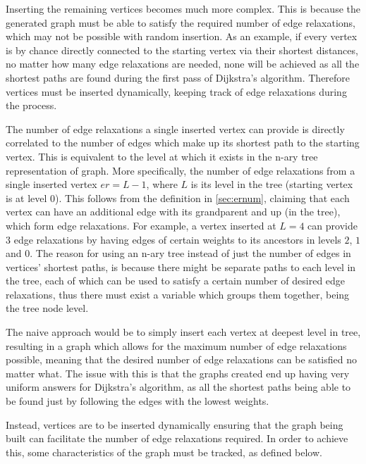 \documentclass{l4proj}
\begin{document}
Inserting the remaining vertices becomes much more complex. This is because the generated graph must be able to satisfy the required number of edge relaxations, which may not be possible with random insertion. As an example, if every vertex is by chance directly connected to the starting vertex via their shortest distances, no matter how many edge relaxations are needed, none will be achieved as all the shortest paths are found during the first pass of Dijkstra's algorithm. Therefore vertices must be inserted dynamically, keeping track of edge relaxations during the process.

The number of edge relaxations a single inserted vertex can provide is directly correlated to the number of edges which make up its shortest path to the starting vertex. This is equivalent to the level at which it exists in the n-ary tree representation of graph. More specifically, the number of edge relaxations from a single inserted vertex $er = L-1$, where $L$ is its level in the tree (starting vertex is at level $0$). This follows from the definition in \autoref{sec:ernum}, claiming that each vertex can have an additional edge with its grandparent and up (in the tree), which form edge relaxations. For example, a vertex inserted at $L=4$ can provide $3$ edge relaxations by having edges of certain weights to its ancestors in levels $2$, $1$ and $0$. The reason for using an n-ary tree instead of just the number of edges in vertices' shortest paths, is because there might be separate paths to each level in the tree, each of which can be used to satisfy a certain number of desired edge relaxations, thus there must exist a variable which groups them together, being the tree node level.

The naive approach would be to simply insert each vertex at deepest level in tree, resulting in a graph which allows for the maximum number of edge relaxations possible, meaning that the desired number of edge relaxations can be satisfied no matter what. The issue with this is that the graphs created end up having very uniform answers for Dijkstra's algorithm, as all the shortest paths being able to be found just by following the edges with the lowest weights.

Instead, vertices are to be inserted dynamically ensuring that the graph being built can facilitate the number of edge relaxations required. In order to achieve this, some characteristics of the graph must be tracked, as defined below.
\end{document}
